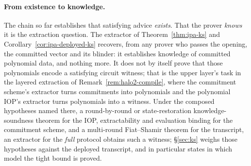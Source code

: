 \documentclass[11pt,a4paper]{article}
\theoremstyle{definition}
\begin{document}
\paragraph{From existence to knowledge.}
The chain so far establishes that satisfying advice \emph{exists}. That
the prover \emph{knows} it is the extraction question. The extractor of
Theorem~\ref{thm:ipa-ks} and Corollary~\ref{cor:ipa-deployed-ks}
recovers, from any prover who passes the opening, the committed vector
and its blinder: it establishes knowledge of committed polynomial data,
and nothing more. It does not by itself
prove that those polynomials encode a satisfying circuit witness; that
is the upper layer's task in the layered extraction of
Remark~\ref{rem:halo2-compile}, where the commitment scheme's extractor
turns commitments into polynomials and the polynomial IOP's extractor
turns polynomials into a witness. Under the composed hypotheses named
there, a round-by-round or state-restoration knowledge-soundness
theorem for the IOP, extractability and evaluation binding for the
commitment scheme, and a multi-round Fiat--Shamir theorem for the transcript, an
extractor for the \emph{full} protocol obtains such a witness;
\S\ref{sec:ks} weighs those hypotheses against the deployed transcript,
and in particular states in which model the tight bound is proved.
\end{document}
